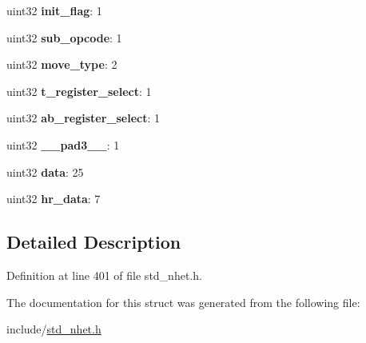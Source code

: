\begin{DoxyCompactItemize}
uint32 {\bfseries init\+\_\+flag}\+: 1
\item 
\mbox{\label{structADM32__format_a05cbd6516dc0f7aa6831f439c7a64b53}} 
uint32 {\bfseries sub\+\_\+opcode}\+: 1
\item 
\mbox{\label{structADM32__format_ad426ffc1888bf143a3ad2f10b749186e}} 
uint32 {\bfseries move\+\_\+type}\+: 2
\item 
\mbox{\label{structADM32__format_a05de383ac106b3b74d1846fb99bc8ef7}} 
uint32 {\bfseries t\+\_\+register\+\_\+select}\+: 1
\item 
\mbox{\label{structADM32__format_a4f1efc055d7d5ab564569656cf901f32}} 
uint32 {\bfseries ab\+\_\+register\+\_\+select}\+: 1
\item 
\mbox{\label{structADM32__format_a04f0b7c9431928c508e6fbae12edfeda}} 
uint32 {\bfseries \+\_\+\+\_\+pad3\+\_\+\+\_\+}\+: 1
\item 
\mbox{\label{structADM32__format_aa978c843ac5ea41e9e4d0427cd5fb8ec}} 
uint32 {\bfseries data}\+: 25
\item 
\mbox{\label{structADM32__format_acc90ad032f6fb11d1b370c1f4862297c}} 
uint32 {\bfseries hr\+\_\+data}\+: 7
\end{DoxyCompactItemize}


\subsection{Detailed Description}


Definition at line 401 of file std\+\_\+nhet.\+h.



The documentation for this struct was generated from the following file\+:\begin{DoxyCompactItemize}
\item 
include/\mbox{\hyperlink{std__nhet_8h}{std\+\_\+nhet.\+h}}\end{DoxyCompactItemize}
